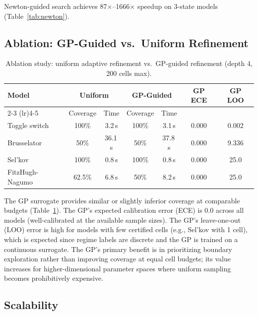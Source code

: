 \documentclass[11pt]{article}
\begin{document}
Newton-guided search achieves 87$\times$--1666$\times$ speedup on 3-state models (Table~\ref{tab:newton}).

\subsection{Ablation: GP-Guided vs.\ Uniform Refinement}

\begin{table}[t]
\centering
\caption{Ablation study: uniform adaptive refinement vs.\ GP-guided refinement (depth 4, 200 cells max).}
\label{tab:ablation}
\small
\begin{tabular}{@{}lcccccc@{}}
\toprule
Model & \multicolumn{2}{c}{Uniform} & \multicolumn{2}{c}{GP-Guided} & GP ECE & GP LOO \\
\cmidrule(lr){2-3} \cmidrule(lr){4-5}
 & Coverage & Time & Coverage & Time & & \\
\midrule
Toggle switch    & 100\% & 3.2\,s  & 100\% & 3.1\,s  & 0.000 & 0.002 \\
Brusselator      & 50\%  & 36.1\,s & 50\%  & 37.8\,s & 0.000 & 9.336 \\
Sel'kov          & 100\% & 0.8\,s  & 100\% & 0.8\,s  & 0.000 & 25.0  \\
FitzHugh-Nagumo  & 62.5\% & 6.8\,s  & 50\%  & 8.2\,s  & 0.000 & 25.0  \\
\bottomrule
\end{tabular}
\end{table}

The GP surrogate provides similar or slightly inferior coverage at comparable budgets (Table~\ref{tab:ablation}).
The GP's expected calibration error (ECE) is 0.0 across all models (well-calibrated at the available sample sizes).
The GP's leave-one-out (LOO) error is high for models with few certified cells (e.g., Sel'kov with 1 cell), which is expected since regime labels are discrete and the GP is trained on a continuous surrogate.
The GP's primary benefit is in prioritizing boundary exploration rather than improving coverage at equal cell budgets; its value increases for higher-dimensional parameter spaces where uniform sampling becomes prohibitively expensive.

\subsection{Scalability}
\end{document}
